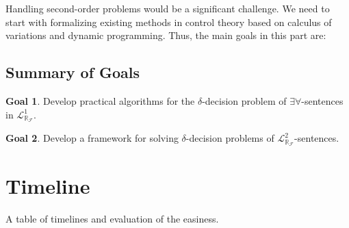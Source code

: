 \documentclass[10pt]{article}
\newcommand{\lrf}{\mathcal{L}_{\mathbb{R}_{\mathcal{F}}}}
\theoremstyle{definition}
\newtheorem{goal}{Goal}
\begin{document}
Handling second-order problems would be a significant challenge. We need to start with formalizing existing methods in control theory based on calculus of variations and dynamic programming. Thus, the main goals in this part are:


\subsection{Summary of Goals}

\begin{goal}
Develop practical algorithms for the $\delta$-decision problem of $\exists\forall$-sentences in $\lrf^1$.
\end{goal}
\begin{goal}
Develop a framework for solving $\delta$-decision problems of $\lrf^2$-sentences.
\end{goal}




\section{Timeline}

A table of timelines and evaluation of the easiness. 














\end{document}
